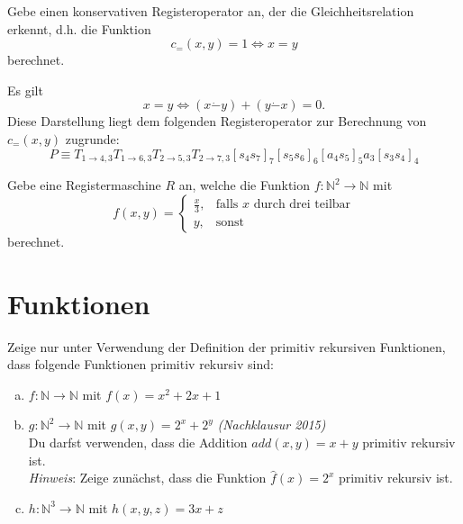 \documentclass[german,headsepline]{scrartcl}
\theoremstyle{definition}
\begin{document}
	\begin{question}[subtitle={Nachklausur 2015}]
		Gebe einen konservativen Registeroperator an,
		der die Gleichheitsrelation erkennt, d.h. die Funktion
		\[c_=(x,y)=1\Leftrightarrow x=y\]
		berechnet.
	\end{question}
	\begin{solution}
		Es gilt
		\[x=y\Leftrightarrow (x\dot{-}y)+(y\dot{-}x)=0.\]
		Diese Darstellung liegt dem folgenden Registeroperator zur Berechnung von $c_=(x,y)$ zugrunde:
		\[P\equiv T_{1\to4,3}T_{1\to6,3}T_{2\to5,3}T_{2\to7,3}[s_4s_7]_7[s_5s_6]_6[a_4s_5]_5a_3[s_3s_4]_4\]
	\end{solution}
	
	\begin{question}[subtitle={Blatt 13, 2015}]
		Gebe eine Registermaschine $R$ an, welche die Funktion $f:\mathbb{N}^2\to\mathbb{N}$ mit
		\[f(x,y)=\begin{cases}
			\frac{x}{3}, &\text{falls $x$ durch drei teilbar} \\
			y, &\text{sonst}
		\end{cases}\]
		berechnet.
	\end{question}
	
	\section{Funktionen}
	\begin{question}
		Zeige nur unter Verwendung der Definition der primitiv rekursiven Funktionen,
		dass folgende Funktionen primitiv rekursiv sind:
		\begin{enumerate}[(a)]
			\item $f:\mathbb{N}\to\mathbb{N}$ mit $f(x)=x^2+2x+1$
			\item $g:\mathbb{N}^2\to\mathbb{N}$ mit $g(x,y)=2^x+2^y$
				\hfill\textit{(Nachklausur 2015)} \\
				Du darfst verwenden, dass die Addition $add(x,y)=x+y$ primitiv rekursiv ist. \\
				\textit{Hinweis}: Zeige zunächst, dass die Funktion $\hat{f}(x)=2^x$ primitiv rekursiv ist.
			\item $h:\mathbb{N}^3\to\mathbb{N}$ mit $h(x,y,z)=3x+z$
		\end{enumerate}
	\end{question}
	
\end{document}
